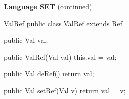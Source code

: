 \begin{minipage}[t]{\sw}
\slidenumber
\LARGE
{\bf Language SET} (continued)
\begin{qv}
ValRef
public class ValRef extends Ref {

    public Val val;

    public ValRef(Val val) {
        this.val = val;
    }

    public Val deRef() {
        return val;
    }

    public Val setRef(Val v) {
        return val = v;
    }
}
\end{qv}
\end{minipage}
\clearpage
